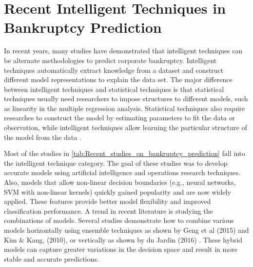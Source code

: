 \section{Recent Intelligent Techniques in Bankruptcy Prediction} 
In recent years, many studies have demonstrated that intelligent techniques can be alternate methodologies to predict corporate bankruptcy. Intelligent techniques automatically extract knowledge from a dataset and construct different model representations to explain the data set. The major difference between intelligent techniques and statistical techniques is that statistical techniques usually need researchers to impose structures to different models, such as linearity in the multiple regression analysis. Statistical techniques also require researches to construct the model by estimating parameters to fit the data or observation, while intelligent techniques allow learning the particular structure of the model from the data \cite{wang2011comparative}.

Most of the studies in \autoref{tab:Recent_studies_on_bankruptcy_prediction} fall into the intelligent technique category. The goal of these studies was to develop accurate models using artificial intelligence and operations research techniques. Also, models that allow non-linear decision boundaries (e.g., neural networks, SVM with non-linear kernels) quickly gained popularity and are now widely applied. These features provide better model flexibility and improved classification performance. A trend in recent literature is studying the combinations of models. Several studies demonstrate how to combine various models horizontally using ensemble techniques as shown by Geng et al (2015) \cite{geng2015prediction} and Kim \& Kang, (2010)\cite{kim2010ensemble}, or vertically as shown by du Jardin (2016) \cite{du2016two}. These hybrid models can capture greater variations in the decision space and result in more stable and accurate predictions.

